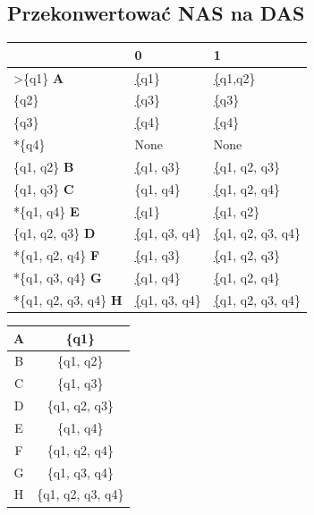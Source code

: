 \documentclass[a4paper,11pt]{article}
\begin{document}
\subsection{Przekonwertować NAS na DAS}
\begin{center}
	\begin{tabular}{|l|l|l|}
		\hline
		                               & 0                    & 1                        \\ \hline
		>\{q1\} \textbf{A}             & {\ul \{q1\}}         & {\ul \{q1,q2\}}          \\ \hline
		\{q2\}                         & {\ul \{q3\}}         & {\ul \{q3\}}             \\ \hline
		\{q3\}                         & {\ul \{q4\}}         & {\ul \{q4\}}             \\ \hline
		*\{q4\}                        & None                 & None                     \\ \hline
		\{q1, q2\} \textbf{B}          & {\ul \{q1, q3\}}     & {\ul \{q1, q2, q3\}}     \\ \hline
		\{q1, q3\} \textbf{C}          & \{q1, q4\}           & {\ul \{q1, q2, q4\}}     \\ \hline
		*\{q1, q4\} \textbf{E}         & {\ul \{q1\}}         & {\ul \{q1, q2\}}         \\ \hline
		\{q1, q2, q3\} \textbf{D}      & {\ul \{q1, q3, q4\}} & {\ul \{q1, q2, q3, q4\}} \\ \hline
		*\{q1, q2, q4\} \textbf{F}     & {\ul \{q1, q3\}}     & {\ul \{q1, q2, q3\}}     \\ \hline
		*\{q1, q3, q4\} \textbf{G}     & {\ul \{q1, q4\}}     & {\ul \{q1, q2, q4\}}     \\ \hline
		*\{q1, q2, q3, q4\} \textbf{H} & {\ul \{q1, q3, q4\}} & {\ul \{q1, q2, q3, q4\}} \\ \hline
	\end{tabular}
	\hspace{1cm}
	\begin{tabular}{|c|c|}
		\hline
		A & \{q1\}             \\ \hline
		B & \{q1, q2\}         \\ \hline
		C & \{q1, q3\}         \\ \hline
		D & \{q1, q2, q3\}     \\ \hline
		E & \{q1, q4\}         \\ \hline
		F & \{q1, q2, q4\}     \\ \hline
		G & \{q1, q3, q4\}     \\ \hline
		H & \{q1, q2, q3, q4\} \\ \hline
	\end{tabular}
	\\
	\vspace{1cm}


\end{center}
\end{document}
